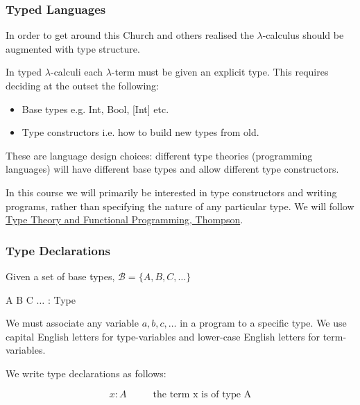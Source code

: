 \documentclass{beamer}
\theoremstyle{indentDefn} \newtheorem{defn}[]{Definition}
\begin{document}
\begin{frame}
	\frametitle{Typed Languages}

  In order to get around this Church and others realised the $\lambda$-calculus should be augmented with type structure. 

  In typed $\lambda$-calculi each $\lambda$-term must be given an explicit type. This requires deciding at the outset the following: 

  \begin{itemize}
    \item Base types e.g. Int, Bool, [Int] etc. 
    \item Type constructors i.e. how to build new types from old.
  \end{itemize}

  These are language design choices: different type theories (programming languages) will have different base types and allow different type constructors. 

  In this course we will primarily be interested in type constructors and writing programs, rather than specifying the nature of any particular type. We will follow \href{https://www.cs.kent.ac.uk/people/staff/sjt/TTFP/}{Type Theory and Functional Programming, Thompson}. 

\end{frame}

\begin{frame}
  \frametitle{Type Declarations}

  Given a set of base types, $\mathcal{B} = \{A,B,C,\dots\}$
  
  \begin{center}
  
  	A B C $\dots$ : Type
  
  \end{center}
  
  We must associate any variable $a,b,c,\dots$ in a program to a specific type. We use capital English letters for type-variables and lower-case English letters for term-variables. 

  We write type declarations as follows: 
  
  $$ x : A \hspace{1cm} \text{ the term x is of type A}$$


  \vspace{30mm}

\end{frame}
\end{document}
